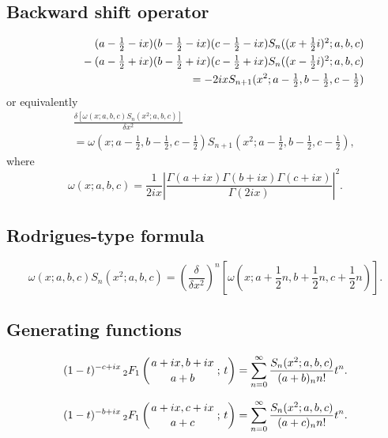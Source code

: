 \documentclass[envcountchap,graybox]{svmono}
\newcommand{\hyp}[5]{\mbox{}_{#1}{F}_{#2}
\left(\genfrac{}{}{0pt}{}{#3}{#4}\,;\,#5\right)}
\newcommand{\mathindent}{\hspace{7.5mm}}
\renewcommand{\Gamma}{\varGamma}
\newcommand{\hyp}[5]{\,\mbox{}_{#1}F_{#2}\!\left(
  \genfrac{}{}{0pt}{}{#3}{#4};#5\right)}
\begin{document}
\subsection*{Backward shift operator}
\begin{eqnarray}
\label{shift2ContDualHahnI}
& &(a-\textstyle\frac{1}{2}-ix)(b-\textstyle\frac{1}{2}-ix)
(c-\textstyle\frac{1}{2}-ix) S_n((x+\textstyle\frac{1}{2}i)^2;a,b,c)\nonumber\\
& &{}\mathindent{}-(a-\textstyle\frac{1}{2}+ix)(b-\textstyle\frac{1}{2}+ix)
(c-\textstyle\frac{1}{2}+ix) S_n((x-\textstyle\frac{1}{2}i)^2;a,b,c)\nonumber\\
& &{}=-2ixS_{n+1}(x^2;a-\textstyle\frac{1}{2},b-\textstyle\frac{1}{2},
c-\textstyle\frac{1}{2})
\end{eqnarray}
or equivalently
\begin{eqnarray}
\label{shift2ContDualHahnII}
& &\frac{\delta\left[\omega(x;a,b,c)S_n(x^2;a,b,c)\right]}{\delta x^2}\nonumber\\
& &{}=\omega(x;a-\textstyle\frac{1}{2},b-\textstyle\frac{1}{2},c-\textstyle\frac{1}{2})
S_{n+1}(x^2;a-\textstyle\frac{1}{2},b-\textstyle\frac{1}{2},c-\textstyle\frac{1}{2}),
\end{eqnarray}
where
$$\omega(x;a,b,c)=\frac{1}{2ix}\left|\frac{\Gamma(a+ix)\Gamma(b+ix)\Gamma(c+ix)}{\Gamma(2ix)}\right|^2.$$

\subsection*{Rodrigues-type formula}
\begin{equation}
\label{RodContDualHahn}
\omega(x;a,b,c)S_n(x^2;a,b,c)=
\left(\frac{\delta}{\delta x^2}\right)^n\left[\omega(x;a+\textstyle\frac{1}{2}n,
b+\textstyle\frac{1}{2}n,c+\textstyle\frac{1}{2}n)\right].
\end{equation}

\subsection*{Generating functions}
\begin{equation}
\label{GenContDualHahn1}
(1-t)^{-c+ix}\,\hyp{2}{1}{a+ix,b+ix}{a+b}{t}
=\sum_{n=0}^{\infty}\frac{S_n(x^2;a,b,c)}{(a+b)_nn!}t^n.
\end{equation}

\begin{equation}
\label{GenContDualHahn2}
(1-t)^{-b+ix}\,\hyp{2}{1}{a+ix,c+ix}{a+c}{t}
=\sum_{n=0}^{\infty}\frac{S_n(x^2;a,b,c)}{(a+c)_nn!}t^n.
\end{equation}
\end{document}
